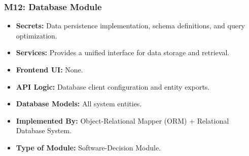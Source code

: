 \subsubsection*{M12: Database Module}
\begin{itemize}
  \item \textbf{Secrets:} Data persistence implementation, schema definitions, and query optimization.
  \item \textbf{Services:} Provides a unified interface for data storage and retrieval.
  \item \textbf{Frontend UI:} None.
  \item \textbf{API Logic:} Database client configuration and entity exports.
  \item \textbf{Database Models:} All system entities.
  \item \textbf{Implemented By:} Object-Relational Mapper (ORM) + Relational Database System.
  \item \textbf{Type of Module:} Software-Decision Module.
\end{itemize}

\endgroup